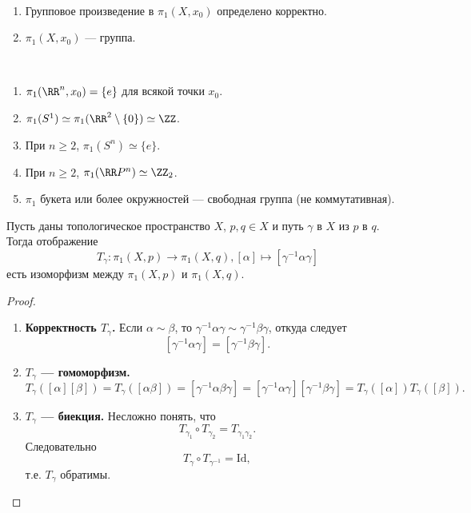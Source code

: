 \documentclass[12pt,a4paper]{article}
\newcommand{\Id}{\ensuremath{\mathrm{Id}}\xspace}
\begin{document}
    \begin{theorem}\ 
        \begin{enumerate}
            \item Групповое произведение в $\pi_1(X, x_0)$ определено корректно.
            \item $\pi_1(X, x_0)$ --- группа.
        \end{enumerate}
    \end{theorem}

    \begin{example}\ 
        \begin{enumerate}
            \item $\pi_1(\RR^n, x_0) = \{e\}$ для всякой точки $x_0$.
            \item $\pi_1(S^1) \simeq \pi_1(\RR^2 \setminus \{0\}) \simeq \ZZ$.
            \item При $n \geqslant 2$, $\pi_1(S^n) \simeq \{e\}$.
            \item При $n \geqslant 2$, $\pi_1(\RR P^n) \simeq \ZZ_2$.
            \item $\pi_1$ букета или более окружностей --- свободная группа (не коммутативная).
        \end{enumerate}
    \end{example}
    
    \begin{theorem}
        Пусть даны топологическое пространство $X$, $p, q \in X$ и путь $\gamma$ в $X$ из $p$ в $q$. Тогда отображение
        \[T_\gamma: \pi_1(X, p) \to \pi_1(X, q), [\alpha] \mapsto [\gamma^{-1} \alpha \gamma]\]
        есть изоморфизм между $\pi_1(X, p)$ и $\pi_1(X, q)$.
    \end{theorem}

    \begin{proof}
        \begin{enumerate}
            \item \textbf{Корректность $T_\gamma$.} Если $\alpha \sim \beta$, то $\gamma^{-1} \alpha \gamma \sim \gamma^{-1} \beta \gamma$, откуда следует
                \[[\gamma^{-1} \alpha \gamma] = [\gamma^{-1} \beta \gamma].\]
            \item \textbf{$T_\gamma$ --- гомоморфизм.}
                \[
                    T_\gamma([\alpha][\beta])
                    = T_\gamma([\alpha\beta])
                    = [\gamma^{-1} \alpha \beta \gamma]
                    = [\gamma^{-1} \alpha \gamma] [\gamma^{-1} \beta \gamma]
                    = T_\gamma([\alpha]) T_\gamma([\beta]).
                \]
            \item \textbf{$T_\gamma$ --- биекция.} Несложно понять, что
                \[T_{\gamma_1} \circ T_{\gamma_2} = T_{\gamma_1 \gamma_2}.\]
                Следовательно
                \[T_\gamma \circ T_{\gamma^{-1}} = \Id,\]
                т.е. $T_\gamma$ обратимы.
        \end{enumerate}
    \end{proof}
\end{document}
